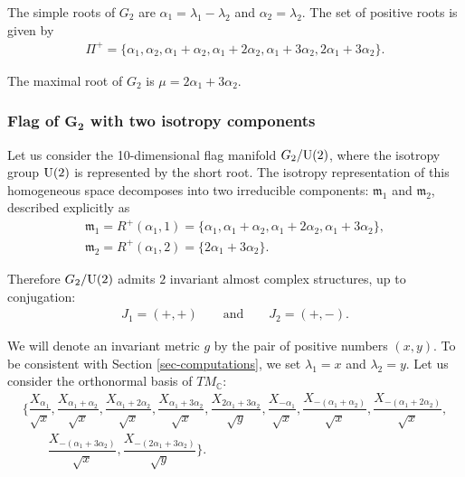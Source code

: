 \documentclass[pdftex]{sigma}%
\numberwithin{equation}{section}
\begin{document}
The simple roots of $G_{2}$ are $\alpha_{1}=\lambda_{1}-\lambda_{2}$ and $\alpha_{2}=\lambda_{2}$. The set of positive roots is given by
\begin{gather*}
\Pi^{+}=\{\alpha_{1},\alpha_{2},\alpha_{1}+\alpha_{2},\alpha_{1}+2\alpha_{2},\alpha_{1}+3\alpha_{2},2\alpha_{1}+3\alpha_{2}\}.
\end{gather*}

The maximal root of $G_{2}$ is $\mu=2\alpha_{1}+3\alpha_{2}$.

\subsubsection[Flag of \protect{$G\textunderscore{}2$} with two isotropy components]
{Flag of $\boldsymbol{G_{2}}$ with two isotropy components}

Let us consider the 10-dimensional flag manifold $G_{2}/{\rm U}(2)$, where the isotropy group ${\rm U}(2)$ is represented by the short root. The isotropy representation of this homogeneous space decomposes into two irreducible components:
$\mathfrak{m}_{1}$ and $\mathfrak{m}_{2}$, described explicitly as
\begin{gather*}
\mathfrak{m}_{1}=R^{+}(\alpha_{1},1)=\{\alpha_{1},\alpha_{1}+\alpha_{2},\alpha_{1} +2\alpha_{2},\alpha_{1}+3\alpha_{2}\},
\\
\mathfrak{m}_{2}=R^{+}(\alpha_{1},2)=\{2\alpha_{1}+3\alpha_{2}\}.
\end{gather*}

Therefore $G_{2}/{\rm U}(2)$ admits $2$ invariant almost complex structures, up to conjugation:
\begin{gather*}
J_{1}=(+,+)\qquad \text{and}\qquad J_{2}=(+,-).
\end{gather*}

We will denote an invariant metric $g$ by the pair of positive numbers $(x,y)$. To be consistent with Section \ref{sec-computations}, we set $\lambda_{1}=x$ and $\lambda_{2}=y$. Let us consider the orthonormal basis of $TM_{\mathbb{C}}$:
\begin{gather*}
\bigg\{\dfrac{X_{\alpha_{1}}}{\sqrt{x}},\dfrac{X_{\alpha_{1}+\alpha_{2}}}{\sqrt{x}}, \dfrac{X_{\alpha_{1}+2\alpha_{2}}}{\sqrt{x}},\dfrac{X_{\alpha_{1}+3\alpha_{2}}}{\sqrt{x}}, \dfrac{X_{2\alpha_{1}+3\alpha_{2}}}{\sqrt{y}},\dfrac{X_{-\alpha_{1}}}{\sqrt{x}},
\dfrac{X_{-(\alpha_{1}+\alpha_{2})}}{\sqrt{x}},\dfrac{X_{-(\alpha_{1}+2\alpha_{2})}}{\sqrt{x}},
\\ \qquad
\dfrac{X_{-(\alpha_{1}+3\alpha_{2})}}{\sqrt{x}},\dfrac{X_{-(2\alpha_{1}+3\alpha_{2})}}{\sqrt{y}}\bigg\}.
\end{gather*}
\end{document}
